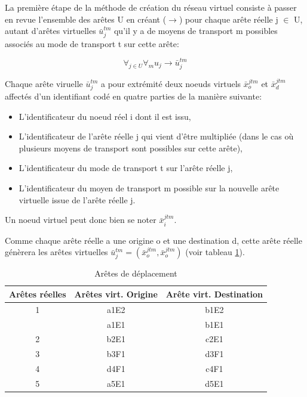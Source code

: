 La première étape de la méthode de création du réseau virtuel
consiste à passer en revue l'ensemble des arêtes U en créant
($\rightarrow$) pour chaque arête réelle j $\in$ U, autant d'arêtes
virtuelles $\bar u_j^{tm}$ qu'il y a de moyens de transport m
possibles associés au mode de transport t sur cette arête:

$$\forall _{j\in U} \forall _m u_j \rightarrow \bar u_j^{tm}$$

Chaque arête viruelle $\bar u_j^{tm}$ a pour extrémité deux noeuds
virtuels $\bar x_o^{jtm}$ et  $\bar x_d^{jtm}$ affectés d'un
identifiant codé en quatre parties de la manière suivante:

\begin{itemize}

\item L'identificateur du noeud réel i dont il est issu,

\item  L'identificateur de l'arête réelle j qui vient d'être multipliée
(dans le cas où plusieurs moyens de transport sont possibles sur cette arête),

\item  L'identificateur du mode de transport t sur l'arête réelle j,

\item L'identificateur du moyen de transport  m possible sur la nouvelle arête
virtuelle issue de l'arête réelle j.
\end{itemize}

Un noeud virtuel peut donc bien se noter  $\bar x_i^{jtm}$.

Comme chaque arête réelle a une origine o et une destination d, cette arête
réelle génèrera les arêtes virtuelles $\bar u_j^{tm}=(\bar x_o^{jtm},\bar
x_o^{jtm})$ (voir tableau \ref{tab3_2}).

\begin{table}[htbp]
\begin{center}
\begin{tabular}{ccc}
\hline
Arêtes réelles & Arêtes virt. Origine & Arête virt. Destination\\

\hline
1 & a1E2 & b1E2\\

  & a1E1 & b1E1\\

2 & b2E1 & c2E1\\

3 & b3F1 & d3F1\\

4 & d4F1 & c4F1\\

5 & a5E1 & d5E1\\
\hline
\end{tabular}
\caption{\label{tab3_2} Ar\^etes de d\'eplacement}
\end{center}
\end{table}

